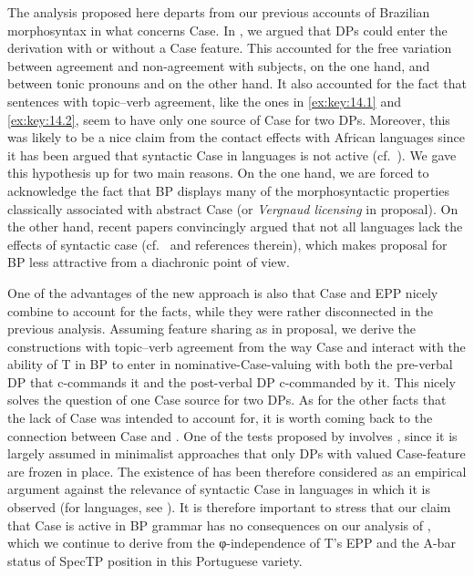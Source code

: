 \documentclass[output=paper]{langsci/langscibook}
\begin{document}
The analysis proposed here departs from our previous accounts of Brazilian
mor\-pho\-syn\-tax in what concerns Case. In
\textcite{AvelarGalves2011,AvelarGalves2016}, we argued that DPs could enter
the derivation with or without a Case feature. This accounted for the free
variation between agreement and non-agreement with subjects, on the one hand, and
between tonic pronouns and  on the other hand. It also accounted for the
fact that sentences with topic--verb agreement, like the ones in
\eqref{ex:key:14.1} and \eqref{ex:key:14.2}, seem to have only one source of
Case for two DPs.  Moreover, this was likely to be a nice claim from the
contact effects with African languages since it has been argued that syntactic
Case in  languages is not active (cf.\ \citealt{Diercks2012}). We gave
this hypothesis up for two main reasons. On the one hand, we are forced to
acknowledge the fact that BP displays many of the morphosyntactic properties
classically associated with abstract Case (or
\emph{Vergnaud licensing} in  proposal).  On the
other hand, recent papers convincingly argued that not all 
languages lack the effects of syntactic case (cf.\ \citealt{vanderWal2015} and
references therein), which makes  proposal for
\gls{BP} less attractive from a diachronic point of
view.

One of the advantages of the new approach is also that Case and \gls{EPP}
nicely combine to account for the facts, while they were rather disconnected in
the previous analysis. Assuming feature sharing as in 
proposal, we derive the constructions with topic--verb agreement from the way
Case and  interact with the ability of T in BP to enter in
nominative-Case-valuing with both the pre-verbal DP that c-commands it and the
post-verbal DP c-commanded by it.  This nicely solves the question of one Case
source for two DPs.  As for the other facts that the lack of Case was intended
to account for, it is worth coming back to the connection between Case and
. One of the tests proposed by \citet{SheevanderWal2018} involves
, since it is largely assumed in minimalist approaches that only
DPs with valued Case-feature are frozen in place. The existence of
 has been therefore considered as an empirical argument against
the relevance of syntactic Case in languages in which it is observed (for 
languages, see \citealt{Diercks2012}). It is therefore important to stress that
our claim that Case is active in \gls{BP} grammar has
no consequences on our analysis of , which we continue to derive
from the φ-independence of T’s \gls{EPP} and the A-bar status of SpecTP
position in this Portuguese variety.
\end{document}
